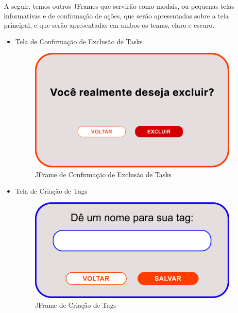 \documentclass[a4paper,12pt]{article}
\begin{document}
A seguir, temos outros JFrames que servirão como modais, ou pequenas telas informativas e de confirmação de ações, que serão apresentadas sobre a tela principal, e que serão apresentadas em ambos os temas, claro e escuro.
\begin{itemize}
	\item Tela de Confirmação de Exclusão de Tasks
	\begin{figure}[H]
		\centering
		\includegraphics[scale=0.20]{prototypes/white/Modal Confirmation.png}
		\caption{JFrame de Confirmação de Exclusão de Tasks}
	\end{figure}

	\item Tela de Criação de Tags
	\begin{figure}[H]
		\centering
		\includegraphics[scale=0.20]{prototypes/white/Add Tag.png}
		\caption{JFrame de Criação de Tags}
	\end{figure}


\end{itemize}
\end{document}
